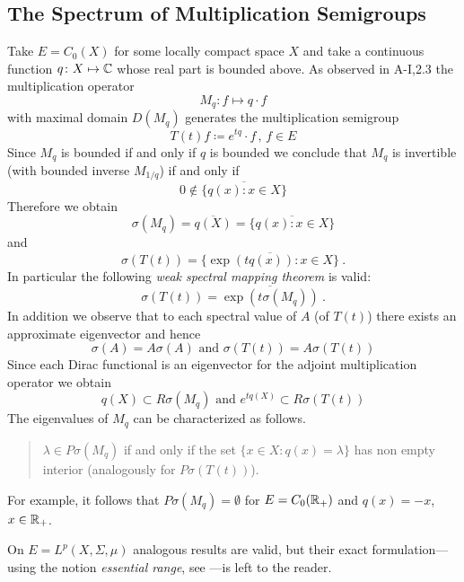\subsection{The Spectrum of Multiplication Semigroups}\label{subsec:a3-2.3}
Take $E = C_{0}(X)$ for some locally compact space $X$ and take a continuous function $q \colon X \mapsto \mathbb{C}$ whose real part is bounded above.
As observed in A-I,2.3 the multiplication operator
\[
M_{q} \colon f \mapsto q \cdot f
\]
with maximal domain $D(M_{q})$ generates the multiplication semigroup
\[
T(t)f \coloneqq e^{tq} \cdot f \, , \, f \in E
\]
Since $M_{q}$ is bounded if and only if $q$ is bounded we conclude that $M_{q}$ is invertible (with bounded inverse $M_{1/q}$) if and only if
\[
0 \notin \overline{\{q(x)  \colon x \in X\}}
\]
Therefore we obtain
\[
\sigma(M_{q}) = \overline{q(X)} = \overline{\{q(x) \colon x \in X\}}
\]
and
\[
\sigma(T(t)) = \overline{\{\exp(tq(x)) \colon x \in X\}}~.
\]
In particular the following \emph{weak spectral mapping theorem} is valid:
\[
\sigma(T(t)) = \overline{\exp(t\sigma(M_{q}))}~.
\]
In addition we observe that to each spectral value of $A$ (\resp of $T(t)$) there exists an approximate eigenvector and hence
\[
\sigma(A) = A\sigma(A) \text{ and } \sigma(T(t)) = A\sigma(T(t))
\]
Since each Dirac functional is an eigenvector for the adjoint multiplication operator we obtain
\[
q(X) \subset R\sigma(M_{q}) \text{ and } e^{tq(X)} \subset R\sigma(T(t))
\]
The eigenvalues of $M_{q}$ can be characterized as follows.
\begin{quote}
$\lambda \in P\sigma(M_{q})$ if and only if the set $\{x \in X \colon q(x) = \lambda\}$ has non empty interior (analogously for $P\sigma(T(t))$).
\end{quote}
For example, it follows that $P\sigma(M_{q}) = \emptyset$ for $E = C_{0}(\mathbb{R}_{+})$ and $q(x) = -x$, $x \in \mathbb{R}_{+}$.

On $E = L^{p}(X,\Sigma,\mu)$ analogous results are valid, but their exact formulation---using the notion \emph{essential range}, see \citet{goldstein:1985a}---is left to the reader.
